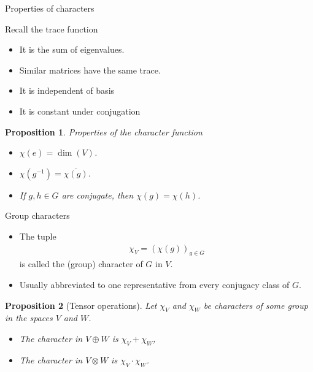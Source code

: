 \documentclass[10pt]{beamer}
\newtheorem{proposition}{Proposition}[theorem]
\begin{document}
	\begin{frame}{Properties of characters}
		\begin{block}{Recall the trace function}
			\begin{itemize}
				\item It is the sum of eigenvalues.
				
				\item Similar matrices have the same trace.
				
				\item It is independent of basis
				
				\item It is constant under conjugation
			\end{itemize}
		\end{block}\pause
		\begin{proposition}{Properties of the character function}
			\begin{itemize}
				
				\item $\chi(e) = \dim(V)$.\pause
				
				\item $\chi(g^{-1}) = \overline{\chi(g)}$.\pause
				
				\item If $g,h \in G$ are conjugate, then $\chi(g) = \chi(h)$.
				
			\end{itemize}
		\end{proposition}
	\end{frame}
	\begin{frame}{Group characters}
		\begin{definition}
			\begin{itemize}
				\item The tuple
			\begin{align*}
				\chi_V = \left(\chi(g)\right)_{g \in G}
			\end{align*}
			is called the \alert{(group) character} of $G$ in $V$.\pause
			
				\item Usually abbreviated to one representative from every conjugacy class of $G$.
			\end{itemize}
		\end{definition}\pause
		
		\begin{proposition}[Tensor operations]
			Let $\chi_V$ and $\chi_W$ be characters of some group in the spaces $V$ and $W$.\pause
			
			\begin{itemize}
				\item The character in $V \oplus W$ is $\chi_V + \chi_W$,\pause
				\item The character in $V \otimes W$ is $\chi_V \cdot \chi_W$.
			\end{itemize}
		\end{proposition}
	\end{frame}
\end{document}
